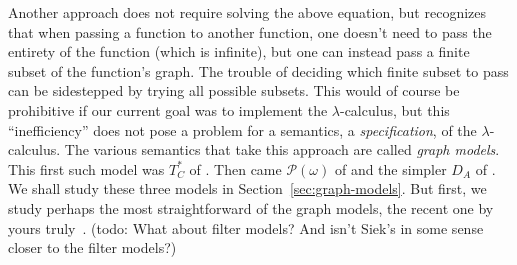 \documentclass{tufte-handout}
\begin{document}
Another approach does not require solving the above equation, but
recognizes that when passing a function to another function, one
doesn't need to pass the entirety of the function (which is infinite),
but one can instead pass a finite subset of the function's graph.  The
trouble of deciding which finite subset to pass can be sidestepped by
trying all possible subsets. This would of course be prohibitive if
our current goal was to implement the $\lambda$-calculus, but this
``inefficiency'' does not pose a problem for a semantics, a
\emph{specification}, of the $\lambda$-calculus. The various semantics
that take this approach are called \emph{graph models}. This first
such model was $T^{*}_C$ of \citet{Plotkin:1972aa}. Then came
$\mathcal{P}(\omega)$ of \citet{Scott:1976lq} and the simpler $D_A$ of
\citet{Engeler:1981aa}. We shall study these three models in
Section~\ref{sec:graph-models}. But first, we study perhaps the most
straightforward of the graph models, the recent one by yours
truly~\citep{Siek:2017ab}. (todo: What about filter models? And isn't
Siek's in some sense closer to the filter models?)
\end{document}
